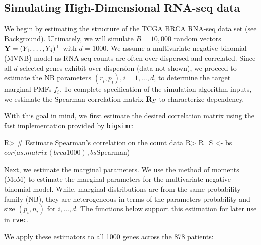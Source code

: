 \documentclass[
]{jss}
\begin{document}
\hypertarget{simulating-high-dimensional-rna-seq-data}{%
\subsection{Simulating High-Dimensional RNA-seq
data}\label{simulating-high-dimensional-rna-seq-data}}

We begin by estimating the structure of the TCGA BRCA RNA-seq data set
(see \href{background}{Background}). Ultimately, we will simulate
\(B=10,000\) random vectors \({\bf Y}=(Y_1, \ldots, Y_d)^\top\) with
\(d=1000\). We assume a multivariate negative binomial (MVNB) model as
RNA-seq counts are often over-dispersed and correlated. Since all \(d\)
selected genes exhibit over-dispersion (data not shown), we proceed to
estimate the NB parameters \((r_i, p_i), i=1,\ldots,d\), to determine
the target marginal PMFs \(f_i\). To complete specification of the
simulation algorithm inputs, we estimate the Spearman correlation matrix
\({ \bf R}_{S}\) to characterize dependency.

With this goal in mind, we first estimate the desired correlation matrix
using the fast implementation provided by \texttt{bigsimr}:

\begin{CodeChunk}
\begin{CodeInput}
R> # Estimate Spearman's correlation on the count data
R> R_S <- bs$cor(as.matrix(brca1000), bs$Spearman)
\end{CodeInput}
\end{CodeChunk}

Next, we estimate the marginal parameters. We use the method of moments
(MoM) to estimate the marginal parameters for the multivariate negative
binomial model. While, marginal distributions are from the same
probability family (NB), they are heterogeneous in terms of the
parameters probability and size \((p_i, n_i)\) for \(i,\ldots,d\). The
functions below support this estimation for later use in \texttt{rvec}.

\begin{CodeChunk}
\end{CodeChunk}

We apply these estimators to all 1000 genes across the 878 patients:
\end{document}
